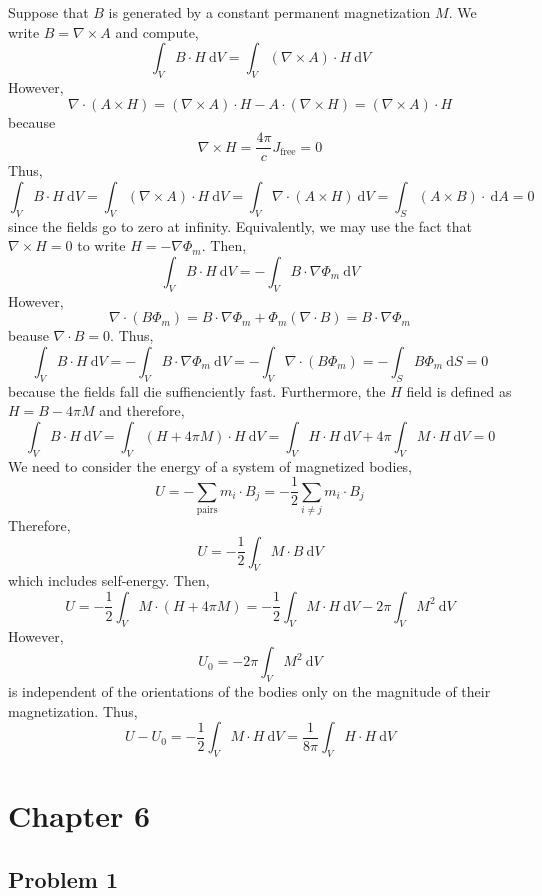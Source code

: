 \documentclass[12pt]{extarticle}
\renewcommand{\d}[1]{\: \mathrm{d}#1}
\theoremstyle{definition}
\begin{document}
Suppose that $B$ is generated by a constant permanent magnetization $M$. We write $B = \nabla \times A$ and compute,
\[ \int_V B \cdot H \d{V} = \int_V (\nabla \times A) \cdot H \d{V} \]
However,
\[ \nabla \cdot ( A \times H) = (\nabla \times A) \cdot H - A \cdot (\nabla \times H) = (\nabla \times A) \cdot H \]
because
\[ \nabla \times H = \frac{4 \pi}{c} J_{\text{free}} = 0 \]
Thus,
\[ \int_V B \cdot H \d{V} = \int_V (\nabla \times A) \cdot H \d{V} = \int_V \nabla \cdot (A \times H) \d{V} = \int_S (A \times B) \cdot \d{A} = 0 \]
since the fields go to zero at infinity. Equivalently, we may use the fact that $\nabla \times H = 0$ to write $H = - \nabla \Phi_m$. Then,
\[ \int_V B \cdot H \d{V} = - \int_V B \cdot \nabla \Phi_m \d{V} \]
However, 
\[ \nabla \cdot (B \Phi_m) = B \cdot \nabla \Phi_m  + \Phi_m (\nabla \cdot B) = B \cdot \nabla \Phi_m \]
beause $\nabla \cdot B = 0$. Thus,
\[ \int_V B \cdot H \d{V} = - \int_V B \cdot \nabla \Phi_m \d{V} = - \int_V \nabla \cdot (B \Phi_m) = - \int_S B \Phi_m \d{S} = 0 \]
because the fields fall die suffienciently fast. Furthermore, the $H$ field is defined as $H = B - 4 \pi M$ and therefore,
\[ \int_V B \cdot H \d{V} = \int_V (H + 4 \pi M) \cdot H \d{V} = \int_V H \cdot H \d{V} + 4 \pi \int_V M \cdot H \d{V} = 0 \]
We need to consider the energy of a system of magnetized bodies,
\[ U = - \sum_{\text{pairs}} m_i \cdot B_j = - \frac{1}{2} \sum_{i \neq j} m_i \cdot B_j \]
Therefore,
\[ U = - \frac{1}{2} \int_V M \cdot B \d{V} \]
which includes self-energy. Then,
\[ U = - \frac{1}{2} \int_V M \cdot (H + 4 \pi M) = - \frac{1}{2} \int_V M \cdot H \d{V} - 2 \pi \int_V M^2 \d{V} \]
However,
\[ U_0 = - 2 \pi \int_V M^2 \d{V} \]
is independent of the orientations of the bodies only on the magnitude of their magnetization. Thus,
\[ U - U_0 = - \frac{1}{2} \int_V M \cdot H \d{V} = \frac{1}{8 \pi} \int_V H \cdot H \d{V} \] 

\section{Chapter 6}

\subsection{Problem 1}
\end{document}
